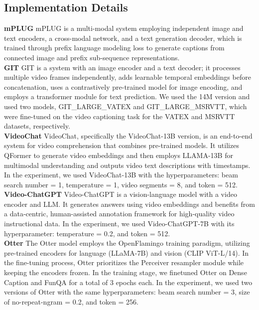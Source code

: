 \subsection{Implementation Details} \label{appendix_c: Exp_result}
\noindent\textbf{mPLUG}\quad
mPLUG is a multi-modal system employing independent image and text encoders, a cross-modal network, and a text generation decoder, which is trained through prefix language modeling loss to generate captions from connected image and prefix sub-sequence representations.\\
\noindent\textbf{GIT}\quad 
GIT is a system with an image encoder and a text decoder; it processes multiple video frames independently, adds learnable temporal embeddings before concatenation, uses a contrastively pre-trained model for image encoding, and employs a transformer module for text prediction. We used the 14M version and used two models, GIT\_LARGE\_VATEX and GIT\_LARGE\_MSRVTT, which were fine-tuned on the video captioning task for the VATEX and MSRVTT datasets, respectively.\\
\noindent\textbf{VideoChat}\quad
VideoChat, specifically the VideoChat-13B version, is an end-to-end system for video comprehension that combines pre-trained models. It utilizes QFormer to generate video embeddings and then employs LLAMA-13B for multimodal understanding and outputs video text descriptions with timestamps. In the experiment, we used VideoChat-13B with the hyperparameters: beam search number = 1, temperature = 1, video segments = 8, and token = 512.\\
\noindent\textbf{Video-ChatGPT}\quad
Video-ChatGPT is a vision-language model with a video encoder and LLM. It generates answers using video embeddings and benefits from a data-centric, human-assisted annotation framework for high-quality video instructional data.
In the experiment, we used Video-ChatGPT-7B with its hyperparameter: temperature = 0.2, and token = 512.\\
\noindent\textbf{Otter}\quad
The Otter model employs the OpenFlamingo training paradigm, utilizing pre-trained encoders for language (LLaMA-7B) and vision (CLIP ViT-L/14). In the fine-tuning process, Otter prioritizes the Perceiver resampler module while keeping the encoders frozen. In the training stage, we finetuned Otter on Dense Caption and FunQA for a total of 3 epochs each. In the experiment, we used two versions of Otter with the same hyperparameters: beam search number = 3,  size of no-repeat-ngram = 0.2, and token = 256.

